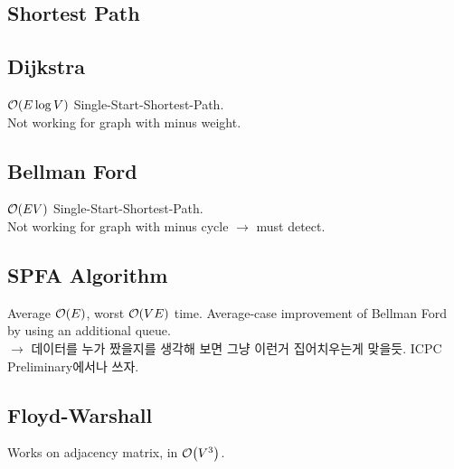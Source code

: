 \documentclass[landscape,8pt]{article}
\begin{document}
\begin{multicols}{2}


\columnbreak

\section{Shortest Path}
  \subsection{Dijkstra}
    $\order{E \log V}$ Single-Start-Shortest-Path.\\
    Not working for graph with minus weight.
      

  \subsection{Bellman Ford}
    $\order{EV}$ Single-Start-Shortest-Path.\\
    Not working for graph with minus cycle $\rightarrow$ must detect.
      

  \subsection{SPFA Algorithm}
    Average $\order{E}$, worst $\order{VE}$ time. Average-case improvement of Bellman Ford by using an additional queue. \\
    $\rightarrow$ 데이터를 누가 짰을지를 생각해 보면 그냥 이런거 집어치우는게 맞을듯. ICPC Preliminary에서나 쓰자.

  \subsection{Floyd-Warshall}
    Works on adjacency matrix, in $\order{V^3}$.
      


\end{multicols}
\end{document}
